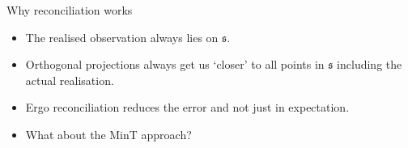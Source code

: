 \documentclass[handout]{beamer}
\begin{document}
%
%  	
  \begin{frame}{Why reconciliation works}
  \begin{itemize}
  	\item The realised observation always lies on $\mathfrak{s}$.
  	\item Orthogonal projections always get us `closer' to all points in $\mathfrak{s}$ including the actual realisation.
  	\item Ergo reconciliation reduces the error and not just in expectation. 
  	\item What about the MinT approach? 
  \end{itemize}
  \end{frame}
\end{document}
